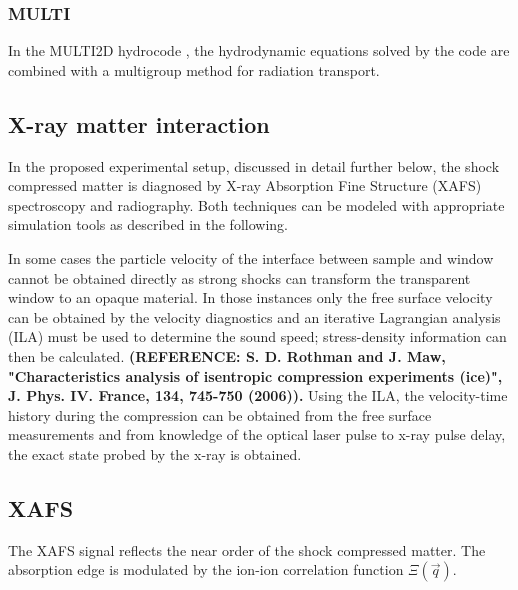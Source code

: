 \documentclass[12pt]{scrartcl}
\begin{document}
\subsubsection{MULTI}
In the MULTI2D hydrocode \cite{Ramis2009},
the hydrodynamic equations solved by the code are combined with a multigroup method for radiation transport.

\subsection{X-ray matter interaction}
In the proposed experimental setup, discussed in detail further below, the shock compressed matter is diagnosed by
X-ray Absorption Fine Structure (XAFS) spectroscopy and radiography. Both techniques can be modeled with appropriate simulation tools as
described in the following.

In some cases the particle velocity of the interface between sample and window cannot be obtained directly as strong shocks can transform the transparent window to an opaque material. In those instances only the free surface velocity can be obtained by the velocity diagnostics and an iterative Lagrangian analysis (ILA) must be used to determine the sound speed; stress-density information can then be calculated. \textbf{(REFERENCE: S. D. Rothman and J. Maw, "Characteristics analysis of isentropic compression experiments (ice)", J. Phys. IV. France, 134, 745-750 (2006)).} Using the ILA, the velocity-time history during the compression can be obtained from the free surface measurements and from knowledge of the optical laser pulse to x-ray pulse delay, the exact state probed by the x-ray is obtained.  
\subsection{XAFS}
The XAFS signal reflects the near order of the shock compressed matter. The absorption edge is modulated by the ion-ion correlation function
$\Xi(\vec q)$.

\printbibliography
\end{document}
